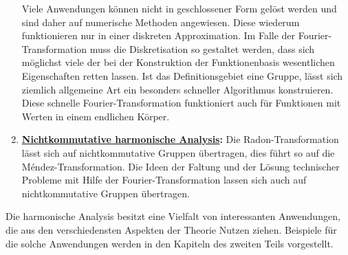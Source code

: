 \begin{enumerate}
Viele Anwendungen können nicht in geschlossener Form gelöst werden
und sind daher auf numerische Methoden angewiesen.
Diese wiederum funktionieren nur in einer diskreten Approximation.
Im Falle der Fourier-Transformation muss die Diskretisation so gestaltet
werden, dass sich möglichst viele der bei der Konstruktion der Funktionenbasis
wesentlichen Eigenschaften retten lassen.
Ist das Definitionsgebiet eine Gruppe, lässt sich ziemlich allgemeine
Art ein besonders schneller Algorithmus konstruieren.
Diese schnelle Fourier-Transformation funktioniert auch für Funktionen
mit Werten in einem endlichen Körper.
\item {\bf \hyperref[buch:chapter:nichtkomm]{Nichtkommutative harmonische Analysis}:}
Die Radon-Transformation lässt sich auf nichtkommutative Gruppen
übertragen, dies führt so auf die Méndez-Transformation.
%
Die Ideen der Faltung und der Lösung technischer Probleme mit Hilfe
der Fourier-Transformation lassen sich auch auf nichtkommutative
Gruppen übertragen.
\end{enumerate}

Die harmonische Analysis besitzt eine Vielfalt von interessanten
Anwendungen, die aus den verschiedensten Aspekten der Theorie
Nutzen ziehen.
Beispiele für die solche Anwendungen werden in den Kapiteln
des zweiten Teils vorgestellt.

